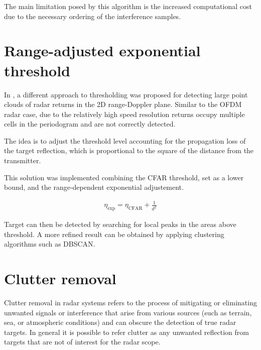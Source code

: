 The main limitation posed by this algorithm is the increased computational cost due to the necessary ordering of the interference samples.


\section{Range-adjusted exponential threshold}

	
	In \cite{Wagner_Feger_Stelzer_2017}, a different approach to thresholding was proposed for detecting large point clouds of radar returns in the 2D range-Doppler plane. Similar to the OFDM radar case, due to the relatively high speed resolution returns occupy multiple cells in the periodogram and are not correctly detected.
	
	The idea is to adjust the threshold level accounting for the propagation loss of the target reflection, which is proportional to the square of the distance from the transmitter. 
	
	This solution was implemented combining the CFAR threshold, set as a lower bound, and the range-dependent exponential adjustement.
	
	\begin{align}
		\eta_{\text{exp}} = \eta_{\text{CFAR}} + \frac{1}{d^2}
	\end{align} 
	
	
	Target can then be detected by searching for local peaks in the areas above threshold. A more refined result can be obtained by applying clustering algorithms such as DBSCAN.

\section{Clutter removal}

Clutter removal in radar systems refers to the process of mitigating or eliminating unwanted signals or interference that arise from various sources (such as terrain, sea, or atmospheric conditions) and can obscure the detection of true radar targets.
In general it is possible to refer clutter as any unwanted reflection from targets that are not of interest for the radar scope.






